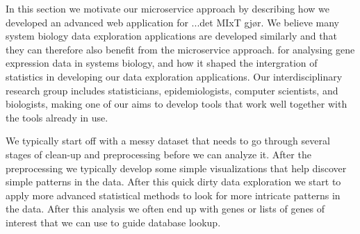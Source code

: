 In this section we motivate our microservice approach by describing how we
developed an advanced web application for ...det MIxT gjør. We believe many
system biology data exploration applications are developed similarly and that
they can therefore also benefit from the microservice approach.
%
for analysing gene expression data in systems biology, and how it shaped the
intergration of statistics in developing our data exploration applications. 
Our interdisciplinary research group includes statisticians, epidemiologists,
computer scientists, and biologists, making one of our
aims to develop tools that work well together with the tools already in use. 

We typically start off with a messy dataset that needs to go through
several stages of clean-up and preprocessing before we can analyze it.
After the
preprocessing we typically develop some simple visualizations that help discover 
simple patterns in the data. 
After this quick dirty data exploration we start to
apply more advanced statistical methods to look for more intricate patterns in
the data.
After this analysis we often end up with genes or lists of genes of
interest that we can use to guide database lookup.

